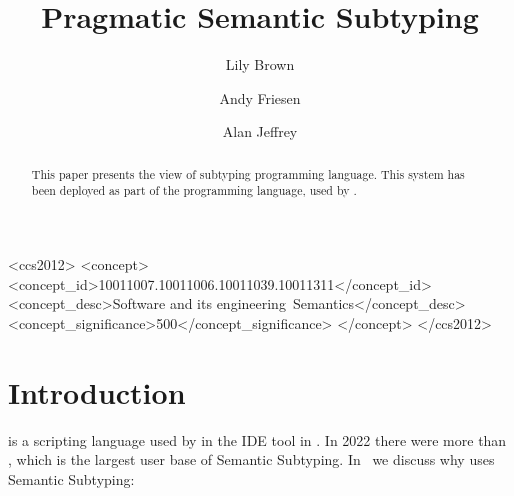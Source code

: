 \documentclass[acmsmall,review,screen]{acmart}
\begin{document}
\title{Pragmatic Semantic Subtyping}

\author{Lily Brown}
\author{Andy Friesen}
\author{Alan Jeffrey}

\begin{abstract}
  This paper presents the view of subtyping
   programming language.
  This system has
  been deployed as part of the  programming language, used
  by .
\end{abstract}

\begin{CCSXML}
<ccs2012>
<concept>
<concept_id>10011007.10011006.10011039.10011311</concept_id>
<concept_desc>Software and its engineering~Semantics</concept_desc>
<concept_significance>500</concept_significance>
</concept>
</ccs2012>
\end{CCSXML}

\maketitle

\section{Introduction}

 is a scripting language used by  in
the IDE tool in . In 2022 there were more than
,
which is the largest user base of Semantic Subtyping.
In~ we discuss why 
uses Semantic Subtyping:

\begin{figure}
  
  \caption{}
  \label{fig:creators}

\end{figure}
\end{document}
